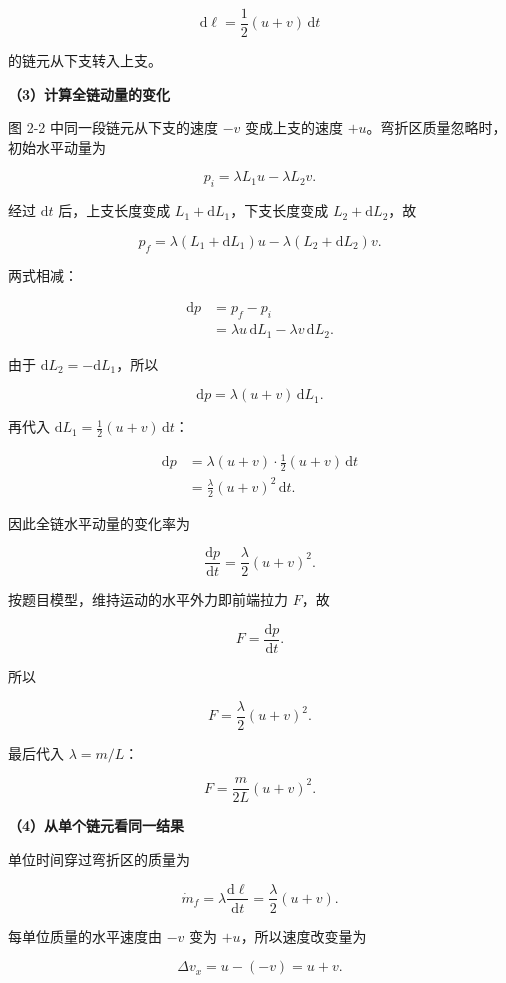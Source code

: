 \documentclass[12pt,a4paper,UTF8]{ctexart}
\begin{document}
\[\mathrm{d}\ell=\frac12(u+v)\,\mathrm{d}t\]

的链元从下支转入上支。

\textbf{（3）计算全链动量的变化}

图 2-2 中同一段链元从下支的速度 \(-v\) 变成上支的速度
\(+u\)。弯折区质量忽略时，初始水平动量为

\[
p_i=\lambda L_1u-\lambda L_2v.
\]

经过 \(\mathrm{d}t\) 后，上支长度变成
\(L_1+\mathrm{d}L_1\)，下支长度变成 \(L_2+\mathrm{d}L_2\)，故

\[
p_f=\lambda(L_1+\mathrm{d}L_1)u-\lambda(L_2+\mathrm{d}L_2)v.
\]

两式相减：

\[
\begin{aligned}
\mathrm{d}p
&=p_f-p_i\\
&=\lambda u\,\mathrm{d}L_1-\lambda v\,\mathrm{d}L_2.
\end{aligned}
\]

由于 \(\mathrm{d}L_2=-\mathrm{d}L_1\)，所以

\[
\mathrm{d}p=\lambda(u+v)\,\mathrm{d}L_1.
\]

再代入 \(\mathrm{d}L_1=\frac12(u+v)\,\mathrm{d}t\)：

\[
\begin{aligned}
\mathrm{d}p
&=\lambda(u+v)\cdot\frac12(u+v)\,\mathrm{d}t\\
&=\frac{\lambda}{2}(u+v)^2\,\mathrm{d}t.
\end{aligned}
\]

因此全链水平动量的变化率为

\[
\frac{\mathrm{d}p}{\mathrm{d}t}=\frac{\lambda}{2}(u+v)^2.
\]

按题目模型，维持运动的水平外力即前端拉力 \(F\)，故

\[
F=\frac{\mathrm{d}p}{\mathrm{d}t}.
\]

所以

\[
\boxed{F=\frac{\lambda}{2}(u+v)^2}.
\]

最后代入 \(\lambda=m/L\)：

\[
\boxed{F=\frac{m}{2L}(u+v)^2}.
\]

\textbf{（4）从单个链元看同一结果}

单位时间穿过弯折区的质量为

\[
\dot m_f=\lambda\frac{\mathrm{d}\ell}{\mathrm{d}t}
=\frac{\lambda}{2}(u+v).
\]

每单位质量的水平速度由 \(-v\) 变为 \(+u\)，所以速度改变量为

\[\Delta v_x=u-(-v)=u+v.\]
\end{document}
